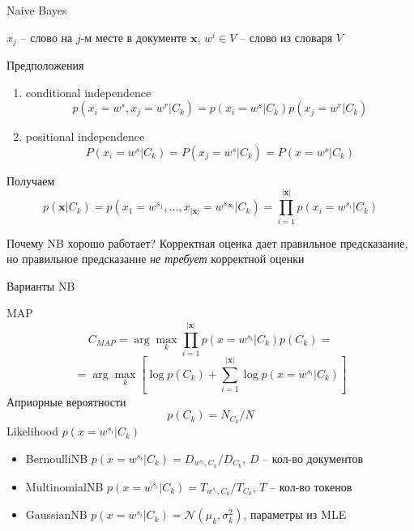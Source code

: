 \documentclass[aspectratio=169]{beamer}
\begin{document}
\begin{frame}{Naive Bayes}

$x_j$ -- слово на $j$-м месте в документе $\mathbf{x}$,
$w^i \in V$ -- слово из словаря $V$

\vspace{1em}
Предположения
\begin{enumerate}
\item conditional independence 
\[
p(x_i=w^s, x_j=w^r | C_k) = p(x_i=w^s | C_k) p(x_j=w^r | C_k)
\]
\item positional independence
\[
P(x_i=w^s | C_k) = P(x_j=w^s | C_k) = P(x = w^s | C_k)
\]
\end{enumerate}

Получаем
\[
p(\mathbf{x} | C_k) = p(x_1=w^{s_1}, \ldots, x_{|\mathbf{x}|}=w^{s_{|\mathbf{x}|}} | C_k) = \prod_{i=1}^{|\mathbf{x}|} p(x_i = w^{s_i} | C_k)
\]

\begin{block}{Почему NB хорошо работает?}
Корректная оценка дает правильное предсказание, но правильное предсказание {\it не требует} корректной оценки
\end{block}

\end{frame}


\begin{frame}{Варианты NB}

MAP
\[
C_{MAP} = \arg \max_k \prod_{i=1}^{|\mathbf{x}|} p(x = w^{s_i} | C_k) p(C_k) = 
\]
\[
= \arg \max_k \left[ \log p(C_k) + \sum_{i=1}^{|\mathbf{x}|} \log p(x = w^{s_i} | C_k) \right]
\]
Априорные вероятности
\[
p(C_k) = N_{C_k}/{N}
\]
Likelihood $p(x = w^{s_i} | C_k)$
\begin{itemize}
\item BernoulliNB $p(x = w^{s_i} | C_k) = D_{w^{s_i}, C_k} / D_{C_k}$, $D$ -- кол-во документов
\item MultinomialNB $p(x = w^{s_i} | C_k) = T_{w^{s_i}, C_k} / T_{C_k}$, $T$ -- кол-во токенов
\item GaussianNB $p(x = w^{s_i} | C_k) = \mathcal{N}(\mu_k, \sigma_k^2)$, параметры из MLE
\end{itemize}

\end{frame}


\end{document}

